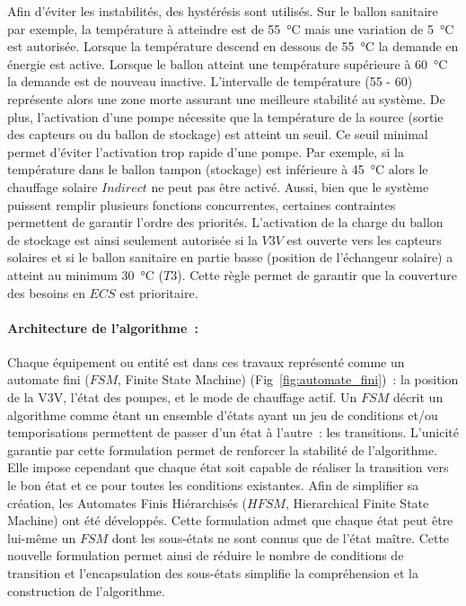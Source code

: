 Afin d’éviter les instabilités, des hystérésis sont utilisés. Sur le ballon sanitaire par
exemple, la température à atteindre est de \SI{55}{\celsius} mais une variation de
\SI{5}{\celsius} est autorisée. Lorsque la température descend en dessous de
\SI{55}{\celsius} la demande en énergie est active. Lorsque le ballon atteint une
température supérieure à \SI{60}{\celsius} la demande est de nouveau inactive.
L’intervalle de température (\num{55} - \num{60}) représente alors une zone morte assurant
une meilleure stabilité au système. De plus, l’activation d’une pompe nécessite que la
température de la source (sortie des capteurs ou du ballon de stockage) est atteint un
seuil. Ce seuil minimal permet d’éviter l’activation trop rapide d’une pompe. Par exemple,
si la température dans le ballon tampon (stockage) est inférieure à \SI{45}{\celsius}
alors le chauffage solaire $Indirect$ ne peut pas être activé. Aussi, bien que le système
puissent remplir plusieurs fonctions concurrentes, certaines contraintes permettent de
garantir l’ordre des priorités. L’activation de la charge du ballon de stockage est ainsi
seulement autorisée si la $V3V$ est ouverte vers les capteurs solaires et si le ballon
sanitaire en partie basse (position de l’échangeur solaire) a atteint au minimum
\SI{30}{\celsius} ($T3$). Cette règle permet de garantir que la couverture des besoins en
$ECS$ est prioritaire.

\paragraph{Architecture de l’algorithme~:} %
\label{par:architecture_de_l_algorithme}
Chaque équipement ou entité est dans ces travaux représenté comme un automate fini ($FSM$,
Finite State Machine) (Fig~\ref{fig:automate_fini})~: la position de la V3V, l’état des
pompes, et le mode de chauffage actif. Un $FSM$ décrit un algorithme comme étant un
ensemble d’états ayant un jeu de conditions et/ou temporisations permettent de passer d’un
état à l’autre~: les transitions. L’unicité garantie par cette formulation permet de
renforcer la stabilité de l’algorithme. Elle impose cependant que chaque état soit capable
de réaliser la transition vers le bon état et ce pour toutes les conditions existantes.
Afin de simplifier sa création, les Automates Finis Hiérarchisés ($HFSM$, Hierarchical
Finite State Machine) ont été développés. Cette formulation admet que chaque état peut
être lui-même un $FSM$ dont les sous-états ne sont connus que de l’état maître. Cette
nouvelle formulation permet ainsi de réduire le nombre de conditions de transition et
l’encapsulation des sous-états simplifie la compréhension et la construction de
l’algorithme.

